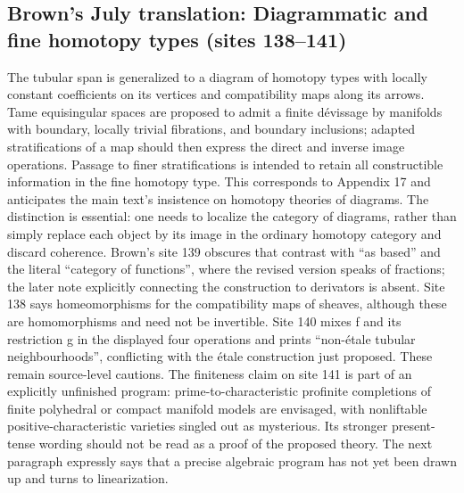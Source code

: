 \documentclass[10pt,oneside]{book}
\begin{document}
\subsection*{Brown's July translation: Diagrammatic and fine homotopy types (sites 138--141)}
The tubular span is generalized to a diagram of homotopy types with locally constant coefficients on its vertices and compatibility maps along its arrows. Tame equisingular spaces are proposed to admit a finite dévissage by manifolds with boundary, locally trivial fibrations, and boundary inclusions; adapted stratifications of a map should then express the direct and inverse image operations. Passage to finer stratifications is intended to retain all constructible information in the fine homotopy type. This corresponds to Appendix 17 and anticipates the main text's insistence on homotopy theories of diagrams. The distinction is essential: one needs to localize the category of diagrams, rather than simply replace each object by its image in the ordinary homotopy category and discard coherence. Brown's site 139 obscures that contrast with ``as based'' and the literal ``category of functions'', where the revised version speaks of fractions; the later note explicitly connecting the construction to derivators is absent. Site 138 says homeomorphisms for the compatibility maps of sheaves, although these are homomorphisms and need not be invertible. Site 140 mixes f and its restriction g in the displayed four operations and prints ``non-étale tubular neighbourhoods'', conflicting with the étale construction just proposed. These remain source-level cautions. The finiteness claim on site 141 is part of an explicitly unfinished program: prime-to-characteristic profinite completions of finite polyhedral or compact manifold models are envisaged, with nonliftable positive-characteristic varieties singled out as mysterious. Its stronger present-tense wording should not be read as a proof of the proposed theory. The next paragraph expressly says that a precise algebraic program has not yet been drawn up and turns to linearization.
\end{document}
